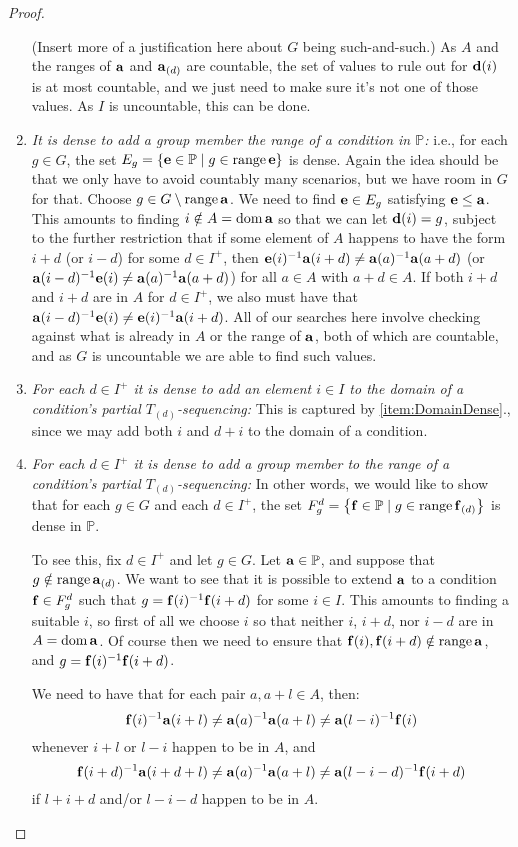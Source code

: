\documentclass{amsart}
\theoremstyle{definition}
\theoremstyle{remark}
\renewcommand{\P}{\mathbb{P}}
\DeclareMathOperator{\ran}{range}
\DeclareMathOperator{\dom}{dom}
\newcommand{\st}{\; | \;}
\newcommand{\set}[2]{\left\{#1\st #2 \right\}}
\renewcommand{\a}{\textup{\textbf{a}}}
\renewcommand{\d}{\textup{\textbf{d}}}
\newcommand{\e}{\textup{\textbf{e}}}
\newcommand{\f}{\textup{\textbf{f}}}
\begin{document}
\begin{proof}
\begin{enumerate}
	(Insert more of a justification here about $G$ being such-and-such.) As $A$ and the ranges of $\a$ and $\a_{(d)}$ are countable, the set of values to rule out for $\d(i)$ is at most countable, and we just need to make sure it's not one of those values. As $I$ is uncountable, this can be done. 
	\item \emph{It is dense to add a group member the range of a condition in $\P$:} i.e., for each $g \in G$, the set $E_g=\set{\e \in \P}{g \in \ran \e }$ is dense. Again the idea should be that we only have to avoid countably many scenarios, but we have room in $G$ for that. Choose $g \in G \setminus \ran \a$. We need to find $\e \in E_g$ satisfying $\e \leq \a$. This amounts to finding $i \notin A = \dom \a$ so that we can let $\d(i)=g$, subject to the further restriction that if some element of $A$ happens to have the form $i+d$ (or $i-d$) for some $d \in I^+$, then $\e(i)^{-1}\a(i+d) \neq \a(a)^{-1}\a(a+d)$ (or $\a(i-d)^{-1}\e(i) \neq \a(a)^{-1}\a(a+d)$) for all $a\in A$ with $a+d \in A$. If both $i+d$ and $i+d$ are in $A$ for $d \in I^+$, we also must have that $\a(i-d)^{-1}\e(i)  \neq \e(i)^{-1}\a(i+d)$. All of our searches here involve checking against what is already in $A$ or the range of $\a$, both of which are countable, and as $G$ is uncountable we are able to find such values.
	\item \label{item:StepFunctionDomainDense} \emph{For each $d \in I^+$ it is dense to add an element $i \in I$ to the domain of a condition's partial $T_{(d)}$-sequencing:} This is captured by \ref{item:DomainDense}., since we may add both $i$ and $d+i$ to the domain of a condition.
	\item \emph{For each $d \in I^+$ it is dense to add a group member to the range of a condition's partial $T_{(d)}$-sequencing:} In other words, we would like to show that for each $g \in G$ and each $d \in I^+$, the set $F^d_g=\set{\f \in \P}{g \in \ran \f_{(d)}}$ is dense in $\P$. 
	
	To see this, fix $d \in I^+$ and let $g \in G$. Let $\a \in \P$, and suppose that $g \notin \ran\a_{(d)}$. We want to see that it is possible to extend $\a$ to a condition $\f \in F^d_g$ such that $g=\f(i)^{-1}\f(i+d)$ for some $i \in I$. This amounts to finding a suitable $i$, so first of all we choose $i$ so that neither $i$, $i+d$, nor $i-d$ are in $A = \dom \a$. Of course then we need to ensure that $\f(i), \f(i+d) \notin \ran \a$, and $g=\f(i)^{-1}\f(i+d)$. 
	
	We need to have that for each pair $a, a+l \in A$, then: $$\f(i)^{-1}\a(i+l)\neq \a(a)^{-1}\a(a+l)\neq \a(l-i)^{-1}\f(i)$$ whenever $i+l$ or $l-i$ happen to be in $A$, and   $$\f(i+d)^{-1}\a(i+d+l)\neq \a(a)^{-1}\a(a+l)\neq \a(l-i-d)^{-1}\f(i+d)$$ if $l+i+d$ and/or $l-i-d$ happen to be in $A$. 
	

\end{enumerate}
\end{proof}
\end{document}
